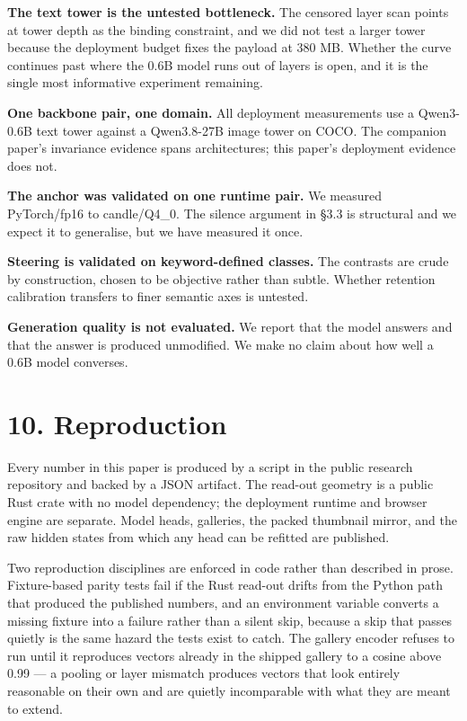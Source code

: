 \documentclass[
  11pt,
]{article}
\begin{document}
\textbf{The text tower is the untested bottleneck.} The censored layer
scan points at tower depth as the binding constraint, and we did not
test a larger tower because the deployment budget fixes the payload at
380 MB. Whether the curve continues past where the 0.6B model runs out
of layers is open, and it is the single most informative experiment
remaining.

\textbf{One backbone pair, one domain.} All deployment measurements use
a Qwen3-0.6B text tower against a Qwen3.8-27B image tower on COCO. The
companion paper's invariance evidence spans architectures; this paper's
deployment evidence does not.

\textbf{The anchor was validated on one runtime pair.} We measured
PyTorch/fp16 to candle/Q4\_0. The silence argument in §3.3 is structural
and we expect it to generalise, but we have measured it once.

\textbf{Steering is validated on keyword-defined classes.} The contrasts
are crude by construction, chosen to be objective rather than subtle.
Whether retention calibration transfers to finer semantic axes is
untested.

\textbf{Generation quality is not evaluated.} We report that the model
answers and that the answer is produced unmodified. We make no claim
about how well a 0.6B model converses.

\section{10. Reproduction}\label{reproduction}

Every number in this paper is produced by a script in the public
research repository and backed by a JSON artifact. The read-out geometry
is a public Rust crate with no model dependency; the deployment runtime
and browser engine are separate. Model heads, galleries, the packed
thumbnail mirror, and the raw hidden states from which any head can be
refitted are published.

Two reproduction disciplines are enforced in code rather than described
in prose. Fixture-based parity tests fail if the Rust read-out drifts
from the Python path that produced the published numbers, and an
environment variable converts a missing fixture into a failure rather
than a silent skip, because a skip that passes quietly is the same
hazard the tests exist to catch. The gallery encoder refuses to run
until it reproduces vectors already in the shipped gallery to a cosine
above 0.99 --- a pooling or layer mismatch produces vectors that look
entirely reasonable on their own and are quietly incomparable with what
they are meant to extend.
\end{document}
